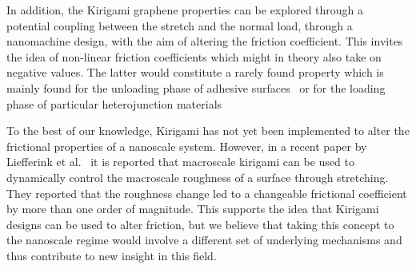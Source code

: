 In addition, the Kirigami graphene properties can be explored through a
potential coupling between the stretch and the normal load, through a
nanomachine design, with the aim of altering the friction coefficient. This
invites the idea of non-linear friction coefficients which might in theory also
take on negative values. The latter would constitute a rarely found property
which is mainly found for the unloading phase of adhesive surfaces~\cite{deng_adhesion-dependent_2012} or for the loading phase of particular heterojunction materials~\cite{Liu_2020, Mandelli_2019}

To the best of our knowledge, Kirigami has not yet been implemented to alter the
frictional properties of a nanoscale system. However, in a recent paper by
Liefferink et al.~\cite{LIEFFERINK2021101475} it is reported that macroscale
kirigami can be used to dynamically control the macroscale roughness of a
surface through stretching. They reported that the roughness change led to a
changeable frictional coefficient by more than one order of magnitude. This
supports the idea that Kirigami designs can be used to alter friction, but we
believe that taking this concept to the nanoscale regime would involve a different set of underlying mechanisms and thus contribute to new insight in
this field.











